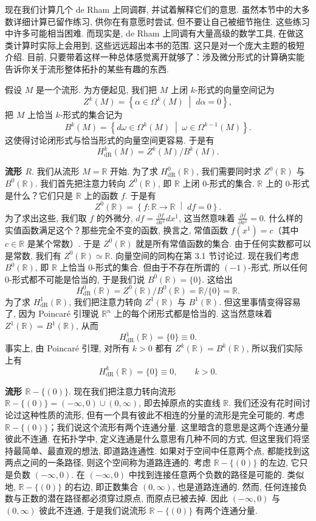 现在我们计算几个 de Rham 上同调群, 并试着解释它们的意思. 虽然本节中的大多数详细计算已留作练习, 供你在有意愿时尝试, 但不要让自己被细节拖住. 这些练习中许多可能相当困难. 而现实是, de Rham 上同调有大量高级的数学工具, 在做这类计算时实际上会用到, 这些远远超出本书的范围. 这只是对一个庞大主题的极短介绍. 目前, 只要带着这样一种总体感觉离开就够了：涉及微分形式的计算确实能告诉你关于流形整体拓扑的某些有趣的东西.

假设 $M$ 是一个流形. 为方便起见, 我们把 $M$ 上闭 $k$-形式的向量空间记为
\[
Z^k(M)=\left\{\alpha\in\Omega^k(M)\;\middle|\;d\alpha=0\right\},
\]
把 $M$ 上恰当 $k$-形式的集合记为
\[
B^k(M)=\left\{d\omega\in\Omega^k(M)\;\middle|\;\omega\in\Omega^{k-1}(M)\right\}.
\]
这使得讨论闭形式与恰当形式的向量空间更容易. 于是有
\[
H_{\mathrm{dR}}^k(M)=Z^k(M)/B^k(M).
\]

\textbf{流形 $R$}. 我们从流形 $M=\mathbb{R}$ 开始. 为了求 $H_{\mathrm{dR}}^0(\mathbb{R})$, 我们需要同时求 $Z^0(\mathbb{R})$ 与 $B^0(\mathbb{R})$. 我们首先把注意力转向 $Z^0(\mathbb{R})$, 即 $\mathbb{R}$ 上闭 0-形式的集合. $\mathbb{R}$ 上的 0-形式是什么？它们只是 $\mathbb{R}$ 上的函数 $f$. 于是有
\[
Z^0(\mathbb{R})=\left\{f:\mathbb{R}\to\mathbb{R}\;\middle|\;df=0\right\}.
\]
为了求出这些, 我们取 $f$ 的外微分, $df=\frac{\partial f}{\partial x^1}dx^1$, 这当然意味着 $\frac{\partial f}{\partial x^1}=0$. 什么样的实值函数满足这个？那些完全不变的函数, 换言之, 常值函数 $f(x^1)=c$（其中 $c\in\mathbb{R}$ 是某个常数）. 于是 $Z^0(\mathbb{R})$ 就是所有常值函数的集合. 由于任何实数都可以是常数, 我们有 $Z^0(\mathbb{R})\simeq\mathbb{R}$. 向量空间的同构在第 3.1 节讨论过. 现在我们考虑 $B^0(\mathbb{R})$, 即 $\mathbb{R}$ 上恰当 0-形式的集合. 但由于不存在所谓的 $(-1)$-形式, 所以任何 0-形式都不可能是恰当的, 于是我们说 $B^0(\mathbb{R})=\{0\}$. 这给出
\[
H_{\mathrm{dR}}^0(\mathbb{R})=Z^0(\mathbb{R})/B^0(\mathbb{R})=\mathbb{R}/\{0\}=\mathbb{R}.
\]
为了求 $H_{\mathrm{dR}}^1(\mathbb{R})$, 我们把注意力转向 $Z^1(\mathbb{R})$ 与 $B^1(\mathbb{R})$. 但这里事情变得容易了, 因为 Poincaré 引理说 $\mathbb{R}^n$ 上的每个闭形式都是恰当的. 这当然意味着 $Z^1(\mathbb{R})=B^1(\mathbb{R})$, 从而
\[
H_{\mathrm{dR}}^1(\mathbb{R})=\{0\}\equiv0.
\]
事实上, 由 Poincaré 引理, 对所有 $k>0$ 都有 $Z^k(\mathbb{R})=B^k(\mathbb{R})$, 所以我们实际上有
\[
H_{\mathrm{dR}}^k(\mathbb{R})=\{0\}\equiv0,\qquad k>0.
\]

\textbf{流形 $\mathbb{R}-\{(0)\}$}. 现在我们把注意力转向流形 $\mathbb{R}-\{(0)\}=(-\infty,0)\cup(0,\infty)$, 即去掉原点的实直线 $\mathbb{R}$. 我们还没有花时间讨论过这种性质的流形, 但有一个具有彼此不相连的分量的流形是完全可能的. 考虑 $\mathbb{R}-\{(0)\}$；我们说这个流形有两个连通分量. 这里暗含的意思是这两个连通分量彼此不连通. 在拓扑学中, 定义连通是什么意思有几种不同的方式, 但这里我们将坚持最简单、最直观的想法, 即道路连通性. 如果对于空间中任意两个点, 都能找到这两点之间的一条路径, 则这个空间称为道路连通的. 考虑 $\mathbb{R}-\{(0)\}$ 的左边, 它只是负数 $(-\infty,0)$. 在 $(-\infty,0)$ 中找到连接任意两个负数的路径是可能的. 类似地, $\mathbb{R}-\{(0)\}$ 的右边, 即正数集合 $(0,\infty)$, 也是道路连通的. 然而, 任何连接负数与正数的潜在路径都必须穿过原点, 而原点已被去掉. 因此 $(-\infty,0)$ 与 $(0,\infty)$ 彼此不连通, 于是我们说流形 $\mathbb{R}-\{(0)\}$ 有两个连通分量.

